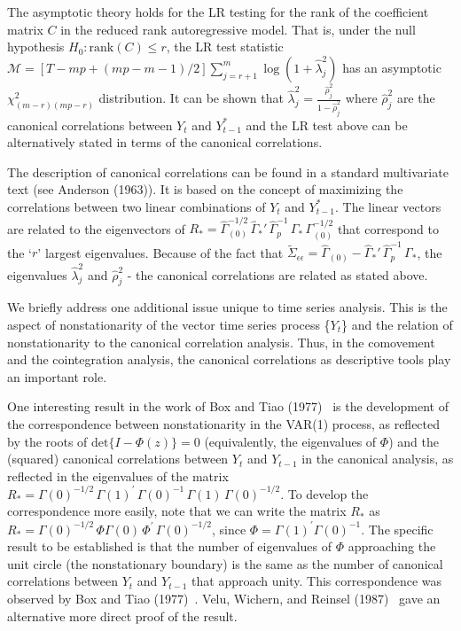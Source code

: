 The asymptotic theory holds for the LR testing for the rank of the coefficient matrix $C$ in the reduced rank autoregressive  model. That is, under the null hypothesis $H_0\!:\!\mbox{rank}(C) \leq r$, the LR test statistic ${\mathcal{M}} = [T\!-\!mp+(mp-m-1)/2] \sum_{j = r + 1}^{m} \log (1+\hat{\lambda}_{j}^{2})$ has an asymptotic $\chi_{(m-r)(mp-r)}^{2}$ distribution. It can be shown that $\hat{\lambda}_j^2=\frac{\hat{\rho}_j^2}{1-\hat{\rho}_j^2}$ where $\hat{\rho}_j^2$ are the canonical correlations between $Y_t$ and $Y_{t-1}^*$ and the LR test above can be alternatively stated in terms of the canonical correlations.


The description of canonical correlations can be found in a standard multivariate text (see Anderson (1963)). It is based on the concept of maximizing the correlations between two linear combinations of $Y_t$ and $Y_{t-1}^*$. The linear vectors are related to the eigenvectors of $R_*=\hat{\Gamma}_{(0)}^{-1/2}\, \hat{\Gamma}_*' \,\hat{\Gamma}_p^{-1}\, \Gamma_* \,\Gamma_{(0)}^{-1/2}$ that correspond to the `$r$' largest eigenvalues. Because of the fact that $\tilde{\Sigma}_{\epsilon\epsilon}=\hat{\Gamma}_{(0)} - \hat{\Gamma}_*' \,\hat{\Gamma}_p^{-1} \, \Gamma_*$, the eigenvalues $\hat{\lambda}_j^2$ and $\hat{\rho}_j^2$ - the canonical correlations are related as stated above.


We briefly address one additional issue unique to time series analysis.  This is the aspect of nonstationarity of the vector time series process \{$Y_t$\} and the relation of nonstationarity to the canonical correlation analysis. Thus, in the comovement and the cointegration analysis, the canonical correlations as descriptive tools play an important role.


One interesting result in the work of Box and Tiao (1977)~\cite{box77} is the development of the correspondence between nonstationarity in the VAR(1) process, as reflected by the roots of $\mbox{det}\{ I - \Phi(z) \} = 0$ (equivalently, the eigenvalues of $\Phi$) and the (squared) canonical correlations between $Y_t$ and $Y_{t-1}$ in the canonical analysis, as reflected in the eigenvalues of the matrix $R_* = \Gamma (0)^{-1/2}\, \Gamma (1)^{\prime}\, \Gamma (0)^{-1}\, \Gamma (1)\, \Gamma (0)^{-1/2}$. To develop the correspondence more easily, note that we can write the matrix $R_*$ as $R_* = \Gamma (0)^{-1/2}\, \Phi \Gamma (0)\, \Phi^{\prime}\, \Gamma (0)^{-1/2}$, since $\Phi = \Gamma (1)^{\prime} \Gamma (0)^{-1}$. The specific result to be established is that the number of eigenvalues of $\Phi$ approaching the unit circle (the nonstationary boundary) is the same as the number of canonical correlations between $Y_t$ and $Y_{t-1}$ that approach unity.  This correspondence was observed by Box and Tiao (1977)~\cite{box77}. Velu, Wichern, and Reinsel (1987)~\cite{velucanon} gave an alternative more direct proof of the result.


